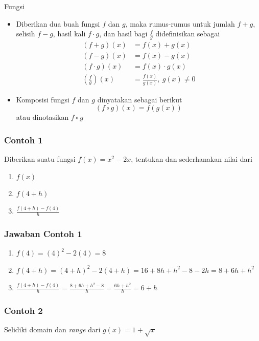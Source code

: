 \documentclass[pdflatex,compress,mathserif]{beamer}
\begin{document}
		\begin{frame}{Fungsi}
			\begin{itemize}
				\item Diberikan dua buah fungsi $ f $ dan $ g $, maka rumus-rumus untuk jumlah $ f+g $, selisih $ f-g $, hasil kali $ f \cdot g $, dan hasil bagi $ \frac{f}{g} $ didefinisikan sebagai
				\begin{align*}
					(f+g)(x) &= f(x) + g(x) \\
					(f-g)(x) &= f(x) - g(x) \\
					(f \cdot g)(x) &= f(x) \cdot g(x) \\
					\left( \frac{f}{g} \right)(x) &= \frac{f(x)}{g(x)},~g(x) \neq 0
				\end{align*}
				\item Komposisi fungsi $ f $ dan $ g $ dinyatakan sebagai berikut
				\begin{equation*}
					(f \circ g)(x) = f(g(x))
				\end{equation*}
				atau dinotasikan $ f \circ g $
			\end{itemize}
		\end{frame}
		
		\begin{frame}
			\frametitle{Contoh 1}
			Diberikan suatu fungsi $ f(x) = x^2 - 2x $, tentukan dan sederhanakan nilai dari
			\begin{enumerate}
				\item $ f(x) $
				\item $ f(4+h) $
				\item $\frac{f(4+h) - f(4)}{h}$
			\end{enumerate}
		\end{frame}
	
		\begin{frame}
			\frametitle{Jawaban Contoh 1}
			\begin{enumerate}
				\item $ f(4) = (4)^2 - 2(4) = 8 $
				\item $ f(4+h) = (4+h)^2 - 2(4+h) = 16 + 8h + h^2 - 8 - 2h = 8 + 6h + h^2 $
				\item $\frac{f(4+h) - f(4)}{h} = \frac{8 + 6h + h^2 - 8}{h} = \frac{6h+h^2}{h} = 6 + h$
			\end{enumerate}
		\end{frame}
	
		\begin{frame}
			\frametitle{Contoh 2}
			Selidiki domain dan \textit{range} dari $ g(x) = 1 + \sqrt{x} $
		\end{frame}
	
\end{document}

